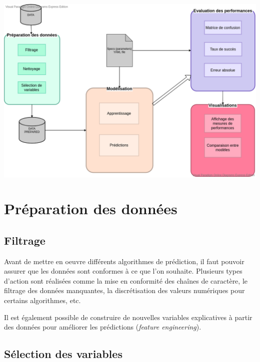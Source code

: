 \begin{center}
  \includegraphics[width=1\textwidth]{figures/Bloc_diagram.png}
  \label{bloc_diagramme}
\end{center}

\section{Préparation des données}

\subsection{Filtrage}

Avant de mettre en oeuvre différents algorithmes de prédiction, il faut pouvoir assurer que les données sont conformes à ce que l’on souhaite. Plusieurs types d’action sont réalisées comme la mise en conformité des chaînes de caractère, le filtrage des données manquantes, la discrétisation des valeurs numériques pour certains algorithmes, etc.

Il est également possible de construire de nouvelles variables explicatives à partir des données pour améliorer les prédictions (\textit{feature engineering}).

\subsection{Sélection des variables}

